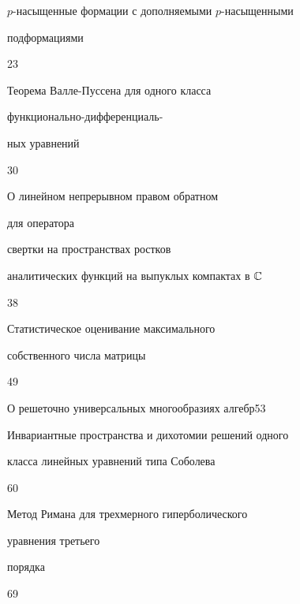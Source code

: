 

{$p$-насыщенные формации с дополняемыми $p$-насыщенными\newline


подформациями}{23}







{Теорема Валле-Пуссена для одного класса 


функционально-дифференциаль-\newline


ных уравнений}{30}







{О линейном непрерывном правом обратном 


для оператора\newline


свертки на пространствах ростков 


аналитических функций на выпуклых компактах в $\Bbb C$}{38}







{Статистическое оценивание максимального 


собственного числа матрицы}{49}







{О решеточно универсальных многообразиях алгебр}{53}







{Инвариантные пространства и дихотомии решений одного\newline


класса линейных уравнений типа Соболева}{60}







{Метод Римана для трехмерного гиперболического


уравнения третьего\newline


порядка}{69}





